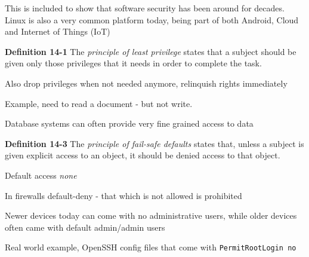 \documentclass[Screen16to9,17pt]{foils}
\begin{document}
This is included to show that software security has been around for decades. Linux is also a very common platform today, being part of both Android, Cloud and Internet of Things (IoT)


\begin{list1}
\item {\bf Definition 14-1} The \emph{principle of least privilege} states that a subject should be given only those privileges that it needs in order to complete the task.
\item Also drop privileges when not needed anymore, relinquish rights immediately
\item Example, need to read a document - but not write.
\item Database systems can often provide very fine grained access to data
\end{list1}


\begin{list1}
\item {\bf Definition 14-3} The \emph{principle of fail-safe defaults} states that, unless a subject is given explicit access to an object, it should be denied access to that object.
\item Default access \emph{none}
\item In firewalls default-deny - that which is not allowed is prohibited
\item Newer devices today can come with no administrative users, while older devices often came with default admin/admin users
\item Real world example, OpenSSH config files that come with \verb+PermitRootLogin no+
\end{list1}



\end{document}
